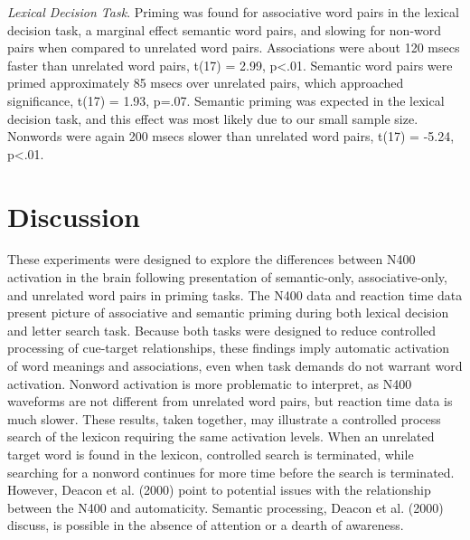 \documentclass[english,man]{apa6}
\theoremstyle{definition}
\theoremstyle{definition}
\theoremstyle{remark}
\begin{document}
\emph{Lexical Decision Task}. Priming was found for associative word
pairs in the lexical decision task, a marginal effect semantic word
pairs, and slowing for non-word pairs when compared to unrelated word
pairs. Associations were about 120 msecs faster than unrelated word
pairs, t(17) = 2.99, p\textless{}.01. Semantic word pairs were primed
approximately 85 msecs over unrelated pairs, which approached
significance, t(17) = 1.93, p=.07. Semantic priming was expected in the
lexical decision task, and this effect was most likely due to our small
sample size. Nonwords were again 200 msecs slower than unrelated word
pairs, t(17) = -5.24, p\textless{}.01.

\section{Discussion}\label{discussion}

These experiments were designed to explore the differences between N400
activation in the brain following presentation of semantic-only,
associative-only, and unrelated word pairs in priming tasks. The N400
data and reaction time data present picture of associative and semantic
priming during both lexical decision and letter search task. Because
both tasks were designed to reduce controlled processing of cue-target
relationships, these findings imply automatic activation of word
meanings and associations, even when task demands do not warrant word
activation. Nonword activation is more problematic to interpret, as N400
waveforms are not different from unrelated word pairs, but reaction time
data is much slower. These results, taken together, may illustrate a
controlled process search of the lexicon requiring the same activation
levels. When an unrelated target word is found in the lexicon,
controlled search is terminated, while searching for a nonword continues
for more time before the search is terminated. However, Deacon et al.
(2000) point to potential issues with the relationship between the N400
and automaticity. Semantic processing, Deacon et al. (2000) discuss, is
possible in the absence of attention or a dearth of awareness.
\end{document}
